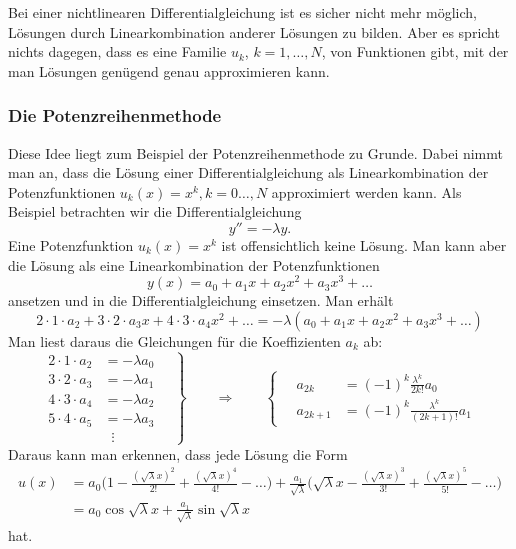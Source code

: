 Bei einer nichtlinearen Differentialgleichung ist es sicher nicht
mehr möglich, Lösungen durch Linearkombination anderer Lösungen
zu bilden.
Aber es spricht nichts dagegen, dass es eine Familie $u_k$, $k=1,\dots,N$,
von Funktionen gibt, mit der man Lösungen genügend genau approximieren
kann.

\subsubsection{Die Potenzreihenmethode}
Diese Idee liegt zum Beispiel der Potenzreihenmethode zu Grunde.
Dabei nimmt man an, dass die Lösung einer Differentialgleichung als
Linearkombination der Potenzfunktionen $u_k(x)=x^k, k=0\dots,N$
approximiert werden kann.
Als Beispiel betrachten wir die Differentialgleichung
\[
y''=-\lambda y.
\]
Eine Potenzfunktion $u_k(x)=x^k$ ist offensichtlich keine Lösung.
Man kann aber die Lösung als eine Linearkombination
der Potenzfunktionen
\[
y(x)
=
a_0+a_1x+a_2x^2+a_3x^3+\dots
\]
ansetzen und in die Differentialgleichung einsetzen.
Man erhält
\[
2\cdot 1 \cdot a_2
+
3\cdot 2 \cdot a_3x
+
4\cdot 3 \cdot a_4x^2
+
\dots
=
-\lambda(
a_0+a_1x+a_2x^2+a_3x^3+\dots)
\]
Man liest daraus die Gleichungen für die Koeffizienten $a_k$ ab:
\begin{equation*}
\left.
\begin{aligned}
2\cdot 1\cdot a_2&=-\lambda a_0\\
3\cdot 2\cdot a_3&=-\lambda a_1\\
4\cdot 3\cdot a_4&=-\lambda a_2\\
5\cdot 4\cdot a_5&=-\lambda a_3\\
&\;\;\vdots
\end{aligned}
\quad
\right\}
\qquad\Rightarrow\qquad
\left\{
\quad
\begin{aligned}
a_{2k}  &=(-1)^k\frac{\lambda^k}{ 2k!   }a_0\\
a_{2k+1}&=(-1)^k\frac{\lambda^k}{(2k+1)!}a_1
\end{aligned}
\right.
\end{equation*}
Daraus kann man erkennen, dass jede Lösung die Form
\begin{align*}
u(x)
&=
a_0
\biggl(
1-\frac{(\sqrt{\lambda}x)^2}{2!} + \frac{(\sqrt{\lambda}x)^4}{4!}-\dots
\biggr)
+
\frac{a_1}{\sqrt{\lambda}}
\biggl(
\sqrt{\lambda}x
-
\frac{(\sqrt{\lambda}x)^3}{3!} + \frac{(\sqrt{\lambda}x)^5}{5!}-\dots
\biggr)
\\
&= a_0 \cos \sqrt{\lambda}x
+ \frac{a_1}{\sqrt{\lambda}} \sin\sqrt{\lambda}x
\end{align*}
hat.

